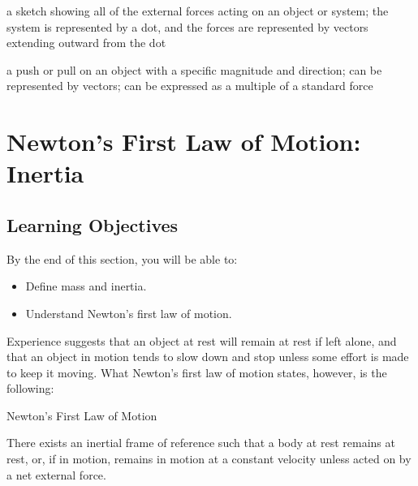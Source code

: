 \documentclass[
]{book}
\providecommand{\tightlist}{%
  \setlength{\itemsep}{0pt}\setlength{\parskip}{0pt}}
\newenvironment{learning-objectives}{}{}
\newenvironment{note}{}{}
\begin{document}
\begin{description}
\tightlist
\item[free-body diagram]
a sketch showing all of the external forces acting on an object or
system; the system is represented by a dot, and the forces are
represented by vectors extending outward from the dot
\end{description}

\begin{description}
\tightlist
\item[force]
a push or pull on an object with a specific magnitude and direction;
can be represented by vectors; can be expressed as a multiple of a
standard force
\end{description}

\hypertarget{newtons-first-law-of-motion-inertia}{%
\section{Newton's First Law of Motion: Inertia}\label{newtons-first-law-of-motion-inertia}}

\hypertarget{fs-id2242465}{}
\begin{learning-objectives}

\hypertarget{learning-objectives-14}{%
\subsection{Learning Objectives}\label{learning-objectives-14}}

By the end of this section, you will be able to:

\begin{itemize}
\tightlist
\item
  Define mass and inertia.
\item
  Understand Newton's first law of motion.
\end{itemize}

\end{learning-objectives}

Experience suggests that an object at rest will remain at rest if left
alone, and that an object in motion tends to slow down and stop unless
some effort is made to keep it moving. What \protect\hypertarget{import-auto-id1777407}{}{Newton's first law of
motion}\textbf{} states, however, is
the following:

\hypertarget{fs-id2690663}{}
\begin{note}

Newton's First Law of Motion

There exists an inertial frame of reference such that a body at rest
remains at rest, or, if in motion, remains in motion at a constant
velocity unless acted on by a net external force.

\end{note}
\end{document}
